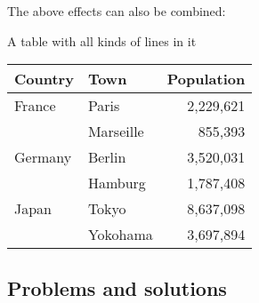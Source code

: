 The above effects can also be combined:
\begin{showlatex}{A table with all kinds of lines in it}
\begin{center}
\begin{tabular}{|l||l|r|}
  \hline
  \textbf{Country}  &  \textbf{Town}  & \textbf{Population} \\
  \hline\hline
  France            & Paris           & 2,229,621           \\
  \cline{2-3}
  {}                & Marseille       &   855,393           \\
  \hline
  Germany           & Berlin          & 3,520,031           \\
  \cline{2-3}
  {}                & Hamburg         & 1,787,408           \\
  \hline
  Japan             & Tokyo           & 8,637,098           \\
  \cline{2-3}
  {}                & Yokohama        & 3,697,894           \\
  \hline
\end{tabular}
\end{center}
\end{showlatex}



\subsection{Problems and solutions}

